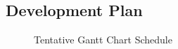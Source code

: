 \documentclass[journal,10pt,draftclsnofoot,onecolumn]{IEEEtran}
\begin{document}
\begin{singlespace}
\clearpage
\section{Development Plan}
\begin{figure}
\centering
 \caption{Tentative Gantt Chart Schedule\label{fig:Tentative Schedule}}
\end{figure}
\begin{figure}
 \ContinuedFloat
 \centering
\end{figure}

\nocite{*}




\end{singlespace}
\end{document}

